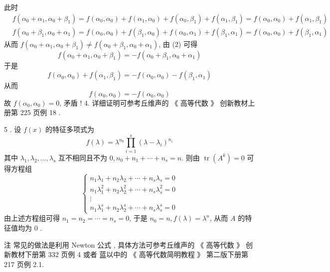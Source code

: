 \documentclass[10pt]{article}
\begin{document}
 此时 
$$
\begin{aligned}
&f\left(\alpha_{0}+\alpha_{1}, \alpha_{0}+\beta_{1}\right)=f\left(\alpha_{0}, \alpha_{0}\right)+f\left(\alpha_{1}, \alpha_{0}\right)+f\left(\alpha_{0}, \beta_{1}\right)+f\left(\alpha_{1}, \beta_{1}\right)=f\left(\alpha_{0}, \alpha_{0}\right)+f\left(\alpha_{1}, \beta_{1}\right) \\
&f\left(\alpha_{0}+\beta_{1}, \alpha_{0}+\alpha_{1}\right)=f\left(\alpha_{0}, \alpha_{0}\right)+f\left(\beta_{1}, \alpha_{0}\right)+f\left(\alpha_{0}, \alpha_{1}\right)+f\left(\beta_{1}, \alpha_{1}\right)=f\left(\alpha_{0}, \alpha_{0}\right)+f\left(\beta_{1}, \alpha_{1}\right)
\end{aligned}
$$
 从而  $f\left(\alpha_{0}+\alpha_{1}, \alpha_{0}+\beta_{1}\right) \neq f\left(\alpha_{0}+\beta_{1}, \alpha_{0}+\alpha_{1}\right)$,  由  (2)  可得 
$$
f\left(\alpha_{0}+\alpha_{1}, \alpha_{0}+\beta_{1}\right)=-f\left(\alpha_{0}+\beta_{1}, \alpha_{0}+\alpha_{1}\right)
$$
 于是 
$$
f\left(\alpha_{0}, \alpha_{0}\right)+f\left(\alpha_{1}, \beta_{1}\right)=-f\left(\alpha_{0}, \alpha_{0}\right)-f\left(\beta_{1}, \alpha_{1}\right)
$$
 从而 
$$
f\left(\alpha_{0}, \alpha_{0}\right)=-f\left(\alpha_{0}, \alpha_{0}\right)
$$
 故  $f\left(\alpha_{0}, \alpha_{0}\right)=0$,  矛盾 ! 4.  详细证明可参考丘维声的 《 高等代数 》 创新教材上册第  225  页例  18 .

5 .  设  $f(x)$  的特征多项式为 
$$
f(\lambda)=\lambda^{n_{0}} \prod_{i=1}^{s}\left(\lambda-\lambda_{i}\right)^{n_{i}}
$$
 其中  $\lambda_{1}, \lambda_{2}, \ldots, \lambda_{s}$  互不相同且不为  $0, n_{0}+n_{1}+\cdots+n_{s}=n$.  则由  $\operatorname{tr}\left(A^{k}\right)=0$  可得方程组 
$$
\left\{\begin{array}{c}
n_{1} \lambda_{1}+n_{2} \lambda_{2}+\cdots+n_{s} \lambda_{s}=0 \\
n_{1} \lambda_{1}^{2}+n_{2} \lambda_{2}^{2}+\cdots+n_{s} \lambda_{s}^{2}=0 \\
\vdots \\
n_{1} \lambda_{1}^{s}+n_{2} \lambda_{2}^{s}+\cdots+n_{s} \lambda_{s}^{s}=0
\end{array}\right.
$$
 由上述方程组可得  $n_{1}=n_{2}=\cdots=n_{s}=0$,  于是  $n_{0}=n, f(\lambda)=\lambda^{n}$,  从而  $A$  的特征值均为  0 .

 注   常见的做法是利用  Newton  公式 ,  具体方法可参考丘维声的 《 高等代数 》 创新教材下册第  332  页例  4  或者   蓝以中的 《 高等代数简明教程 》 第二版下册第  217  页例  2.1.
\end{document}

